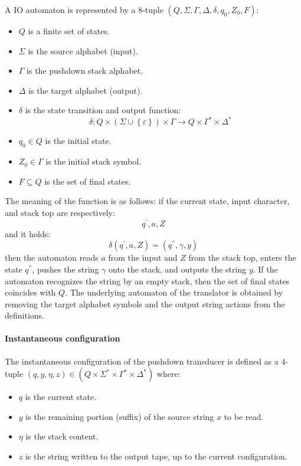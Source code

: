 A IO automaton is represented by a $8$-tuple $\left( Q, \Sigma, \Gamma, \Delta, \delta, q_0, Z_0, F \right)$:
\begin{itemize}
    \item $Q$ is a finite set of states.
    \item $\Sigma$ is the source alphabet (input). 
    \item $\Gamma$ is the pushdown stack alphabet. 
    \item $\Delta$ is the target alphabet (output). 
    \item $\delta$ is the state transition and output function: 
        \[\delta : Q \times \left( \Sigma \cup \left\{ \varepsilon \right\} \right) \times \Gamma \rightarrow Q \times \Gamma^{*} \times \Delta^{*}\]
    \item $q_0 \in Q$ is the initial state. 
    \item $Z_0 \in \Gamma$ is the initial stack symbol. 
    \item $F \subseteq Q$ is the set of final states. 
\end{itemize}
The meaning of the function is as follows: if the current state, input character, and stack top are respectively: 
\[ q^{'}, a, Z \]
and it holds: 
\[ \delta\left(q^{'}, a, Z\right) = \left( q^{{''}}, \gamma, y \right) \]
then the automaton reads $a$ from the input and $Z$ from the stack top, enters the state $q^{{''}}$, pushes the string $\gamma$ onto the stack, and outputs the string $y$.
If the automaton recognizes the string by an empty stack, then the set of final states coincides with $Q$.
The underlying automaton of the translator is obtained by removing the target alphabet symbols and the output string actions from the definitions.

\paragraph*{Instantaneous configuration}
The instantaneous configuration of the pushdown transducer is defined as a $4$-tuple $\left( q, y, \eta, z \right) \in \left( Q \times \Sigma^{*} \times \Gamma^{*} \times \Delta^{*} \right)$ where:
\begin{itemize}
    \item $q$ is the current state. 
    \item $y$ is the remaining portion (suffix) of the source string $x$ to be read. 
    \item $\eta$ is the stack content. 
    \item $z$ is the string written to the output tape, up to the current configuration. 
\end{itemize}

